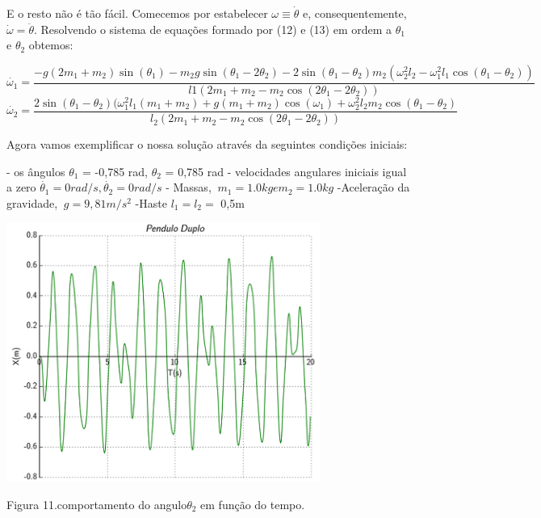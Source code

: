 \documentclass[a4paper]{article} %
\begin{document}
E o resto n\~{a}o \'{e} t\~{a}o f\'{a}cil. Comecemos por estabelecer $\omega \equiv \dot{\theta} $ e, consequentemente, $\dot{\omega} = \ddot{\theta}$. Resolvendo o sistema de equa\c{c}\~{o}es formado por (12) e (13) em ordem a $\theta_1$ e $\theta_2$
obtemos:

\[\dot{\omega_1} = \frac{-g(2m_1+m_2)\sin(\theta_1)-m_2g\sin(\theta_1 - 2\theta_2)-2\sin(\theta_1-\theta_2)m_2(\omega_2^2l_2-\omega_1^2l_1\cos(\theta_1-\theta_2))}{l1(2m_1 + m_2 -m_2\cos(2\theta_1-2\theta_2))}\]
\[\dot{\omega_2} = \frac{2\sin(\theta_1-\theta_2)(\omega_1^{2}l_1(m_1+m_2)+g(m_1+m_2)\cos(\omega_1)+\omega_2^{2}l_2m_2\cos(\theta_1-\theta_2) }{l_2(2m_1+m_2-m_2\cos(2\theta_1-2\theta_2))}\]

Agora vamos exemplificar o nossa solução através da seguintes condições iniciais:

- os \^{a}ngulos $\theta_1$ = -0,785 rad, $\theta_2$ = 0,785 rad
- velocidades angulares iniciais igual a zero $\dot{\theta_1} = 0 rad/s, \dot{\theta_2} = 0 rad/s$
- Massas, $\ m_1 = 1.0kg e m_2 = 1.0kg$
-Acelera\c{c}\~{a}o da gravidade, $\ g = 9,81 m/s^2$
-Haste $l_1 = l_2 =$ 0,5m 
 \vspace{1cm} 
\begin{center}
	\includegraphics[width=4.04in,height=3.34in, keepaspectratio=false]{pendulo_duploTX.png}
	
	\scriptsize {Figura 11.comportamento do angulo$\theta_2$ em fun\c{c}\~{a}o do tempo.}
\end{center}
\end{document}
